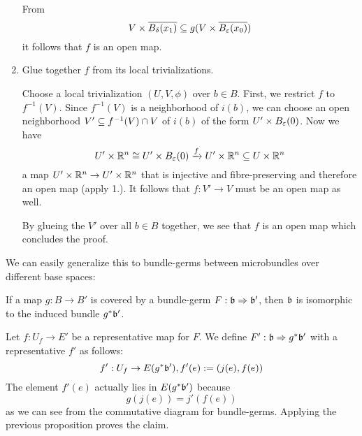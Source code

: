 \begin{myproof}
\begin{enumerate}
        From
        \[ V \times \clball[\delta][x_1] \sub g(V \times \clball[\varepsilon][x_0]) \]
        it follows that $f$ is an open map.

        \item Glue together $f$ from its local trivializations.

        Choose a local trivialization $(U, V, \phi)$ over $b \in B$.
        First, we restrict $f$ to $f^{-1}(V)$.
        Since $f^{-1}(V)$ is a neighborhood of $i(b)$, we can choose an open neighborhood $V' \subseteq{} f^{-1}(V) \cap V$ of $i(b)$ of the form $U' \times \ball[\varepsilon]$.
        Now we have
        \[ U' \times \R^n \cong U' \times \ball[\varepsilon] \xto{f} U' \times \R^n \sub U \times \R^n \]
        a map $U' \times \mathbb{R}^n \to U' \times \mathbb{R}^n$ that is injective and fibre-preserving and therefore an open map (apply 1.).
        It follows that $f: V' \to V$ must be an open map as well.

        By glueing the $V'$ over all $b \in B$ together, we see that $f$ is an open map which concludes the proof.
    \end{enumerate}
\end{myproof}

\begin{myparagraph}
    We can easily generalize this to bundle-germs between microbundles over different base spaces:
\end{myparagraph}

\begin{mycorollary}
    If a map $g: B \to B'$ is covered by a bundle-germ $F: \mathfrak{b} \Rightarrow \mathfrak{b}'$, then $\mathfrak{b}$ is isomorphic to the induced bundle $g^*\mathfrak{b}'$.
\end{mycorollary}
\begin{myproof}
    Let $f: U_f \to E'$ be a representative map for $F$.
    We define $F': \mathfrak{b} \Rightarrow g^*\mathfrak{b}'$ with a representative $f'$ as follows:
    \[ f': U_f \to E(g^*\mathfrak{b}'), f'(e) := (j(e), f(e)) \]
    The element $f'(e)$ actually lies in $E(g^*\mathfrak{b}')$ because
    \[ g(j(e)) = j'(f(e)) \]
    as we can see from the commutative diagram for bundle-germs.
    Applying the previous proposition proves the claim.
\end{myproof}